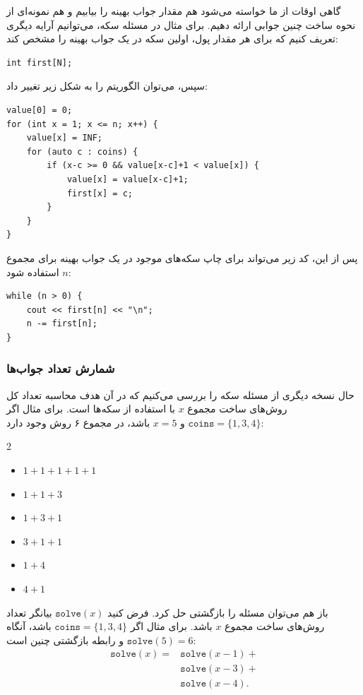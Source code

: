 گاهی اوقات از ما خواسته می‌شود هم مقدار
جواب بهینه را بیابیم و هم
نمونه‌ای از نحوه ساخت چنین جوابی ارائه دهیم.
برای مثال در مسئله سکه،
می‌توانیم آرایه دیگری تعریف کنیم
که برای هر مقدار پول، اولین سکه
در یک جواب بهینه را مشخص کند:
\begin{lstlisting}
int first[N];
\end{lstlisting}
سپس، می‌توان الگوریتم را به شکل زیر تغییر داد:
\begin{lstlisting}
value[0] = 0;
for (int x = 1; x <= n; x++) {
    value[x] = INF;
    for (auto c : coins) {
        if (x-c >= 0 && value[x-c]+1 < value[x]) {
            value[x] = value[x-c]+1;
            first[x] = c;
        }
    }
}
\end{lstlisting}
پس از این، کد زیر می‌تواند برای
چاپ سکه‌های موجود در یک جواب بهینه برای
مجموع $n$ استفاده شود:
\begin{lstlisting}
while (n > 0) {
    cout << first[n] << "\n";
    n -= first[n];
}
\end{lstlisting}

\subsubsection{شمارش تعداد جواب‌ها}

حال نسخه دیگری از مسئله سکه را بررسی می‌کنیم که در آن هدف محاسبه تعداد کل روش‌های ساخت مجموع $x$ با استفاده از سکه‌ها است.
برای مثال اگر $\texttt{coins}=\{1,3,4\}$ و $x=5$ باشد، در مجموع ۶ روش وجود دارد:

\begin{multicols}{2}
\begin{itemize}
\item $1+1+1+1+1$
\item $1+1+3$
\item $1+3+1$
\item $3+1+1$
\item $1+4$
\item $4+1$
\end{itemize}
\end{multicols}

باز هم می‌توان مسئله را بازگشتی حل کرد.
فرض کنید $\texttt{solve}(x)$ بیانگر تعداد روش‌های ساخت مجموع $x$ باشد.
برای مثال اگر $\texttt{coins}=\{1,3,4\}$ باشد،
آنگاه $\texttt{solve}(5)=6$ و رابطه بازگشتی چنین است:
\begin{equation*}
\begin{split}
\texttt{solve}(x) = & \texttt{solve}(x-1) + \\
                    & \texttt{solve}(x-3) + \\
                    & \texttt{solve}(x-4)  .
\end{split}
\end{equation*}

